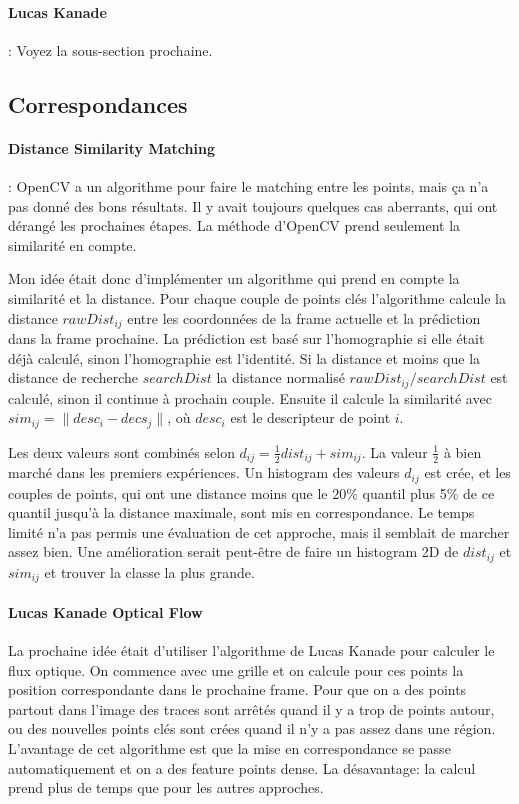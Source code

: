 \documentclass[8pt,twoside=off,titlepage=false, twocolumn]{scrartcl}
\begin{document}
\paragraph{Lucas Kanade} : Voyez la sous-section prochaine.

\subsection{Correspondances}

\paragraph{Distance Similarity Matching}: OpenCV a un algorithme pour faire le matching entre les points, mais ça n'a pas donné des bons résultats. Il y avait toujours quelques cas aberrants, qui ont dérangé les prochaines étapes. La méthode d'OpenCV prend seulement la similarité en compte.

Mon idée était donc d'implémenter un algorithme qui prend en compte la similarité et la distance. Pour chaque couple de points clés l'algorithme calcule la distance $rawDist_{ij} $ entre les coordonnées de la frame actuelle et la prédiction dans la frame prochaine. La prédiction est basé sur l'homographie si elle était déjà calculé, sinon l'homographie est l'identité. Si la distance et moins que la distance de recherche $searchDist$ la distance normalisé $rawDist_{ij} / searchDist$ est calculé, sinon il continue à prochain couple. Ensuite il calcule la similarité avec $sim_{ij} = \| desc_i - decs_j \|$, où $desc_i$ est le descripteur de point $i$. 

Les deux valeurs sont combinés selon $d_{ij} = \frac{1}{2} dist_{ij} + sim_{ij}$. La valeur $\frac{1}{2}$ à bien marché dans les premiers expériences. Un histogram des valeurs $d_{ij}$ est crée, et les couples de points, qui ont une distance moins que le $20\%$ quantil plus 5\% de ce quantil jusqu'à la distance maximale, sont mis en correspondance. Le temps limité n'a pas permis une évaluation de cet approche, mais il semblait de marcher assez bien. Une amélioration serait peut-être de faire un histogram 2D de $dist_{ij}$ et $sim_{ij}$ et trouver la classe la plus grande.

\paragraph{Lucas Kanade Optical Flow}

La prochaine idée était d'utiliser l'algorithme de Lucas Kanade pour calculer le flux optique. On commence avec une grille et on calcule pour ces points la position correspondante dans le prochaine frame. Pour que on a des points partout dans l'image des traces sont arrêtés quand il y a trop de points autour, ou des nouvelles points clés sont crées quand il n'y a pas assez dans une région. L'avantage de cet algorithme est que la mise en correspondance se passe automatiquement et on a des feature points dense. La désavantage: la calcul prend plus de temps que pour les autres approches.
\end{document}
